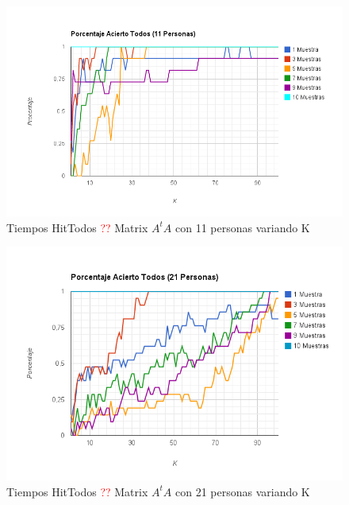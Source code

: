 \begin{figure}[H]
\includegraphics[width=1\textwidth]{img/image10.png}
     \caption{Tiempos HitTodos \textcolor{red}{??} Matrix $A^tA$ con 11 personas variando K}
     \label{fig:figura1}
\end{figure}

\begin{figure}[H]
\includegraphics[width=1\textwidth]{img/image11.png}
     \caption{Tiempos HitTodos \textcolor{red}{??} Matrix $A^tA$ con 21 personas variando K}
     \label{fig:figura1}
\end{figure}

